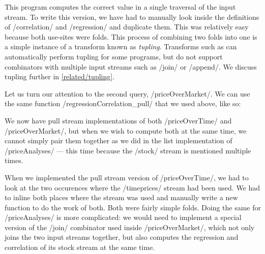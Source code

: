 This program computes the correct value in a single traversal of the input stream.
To write this version, we have had to manually look inside the definitions of \Hs/correlation/ and \Hs/regression/ and duplicate them.
This was relatively easy because both use-sites were folds.
This process of combining two folds into one is a simple instance of a transform known as \emph{tupling}.
Transforms such as \cite{hu1997tupling,hu2005program,chiba2010program} can automatically perform tupling for some programs, but do not support combinators with multiple input streams such as \Hs/join/ or \Hs/append/.
We discuss tupling further in \cref{related/tupling}.



Let us turn our attention to the second query, \Hs/priceOverMarket/.
We can use the same function \Hs/regressionCorrelation_pull/ that we used above, like so:


We now have pull stream implementations of both \Hs/priceOverTime/ and \Hs/priceOverMarket/, but when we wish to compute both at the same time, we cannot simply pair them together as we did in the list implementation of \Hs/priceAnalyses/ --- this time because the \Hs/stock/ stream is mentioned multiple times.

When we implemented the pull stream version of \Hs/priceOverTime/, we had to look at the two occurences where the \Hs/timeprices/ stream had been used.
We had to inline both places where the stream was used and manually write a new function to do the work of both.
Both were fairly simple folds.
Doing the same for \Hs/priceAnalyses/ is more complicated: we would need to implement a special version of the \Hs/join/ combinator used inside \Hs/priceOverMarket/, which not only joins the two input streams together, but also computes the regression and correlation of its stock stream at the same time.

